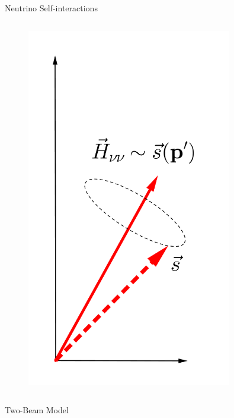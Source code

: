 \documentclass[9pt]{beamer}
\begin{document}
\begin{darkframes}
\begin{frame}{Neutrino Self-interactions}
\begin{columns}[T]
\begin{column}{0.5\textwidth}
      \begin{figure}
         \includegraphics[width=0.8\textwidth]{assets/self-interaction}
      \end{figure}




   \end{column}


\end{columns}





\end{frame}

\begin{frame}{Two-Beam Model}

\begin{columns}[T]

\begin{column}{0.3\textwidth}


\end{column}
\end{columns}
\end{frame}
\end{darkframes}
\end{document}
